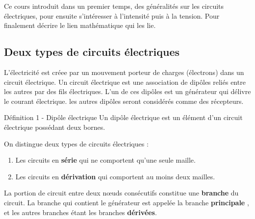 \documentclass[french, a4paper, 12pt]{article}
\begin{document}
Ce cours introduit dans un premier temps, des généralités sur les circuits électriques, pour ensuite s'intéresser à l'intensité puis à la tension. Pour finalement décrire le lien mathématique qui les lie.

\subsection{Deux types de circuits électriques}



L'électricité est créee par un mouvement porteur de charges (électrons) dans un circuit électrique. Un circuit électrique est une association de dipôles reliés entre les autres par des fils électriques. L'un de ces dipôles est un générateur qui délivre le courant électrique. les autres dipôles seront considérés comme des récepteurs. 

\begin{definition}{Définition 1 - Dipôle électrique}
	Un dipôle électrique est un élément d'un circuit électrique possédant deux bornes.
\end{definition}


On distingue deux types de circuits électriques : 
\begin{enumerate}
	\item Les circuits en \textbf{série} qui ne comportent qu'une seule maille.
	\item Les circuits en \textbf{dérivation} qui comportent au moins deux mailles.
\end{enumerate}

La portion de circuit entre deux n\oe uds consécutifs constitue une \textbf{branche} du circuit. La branche qui contient le générateur est appelée la branche \textbf{principale} , et les autres branches étant les branches \textbf{dérivées}.\medskip 
\end{document}
